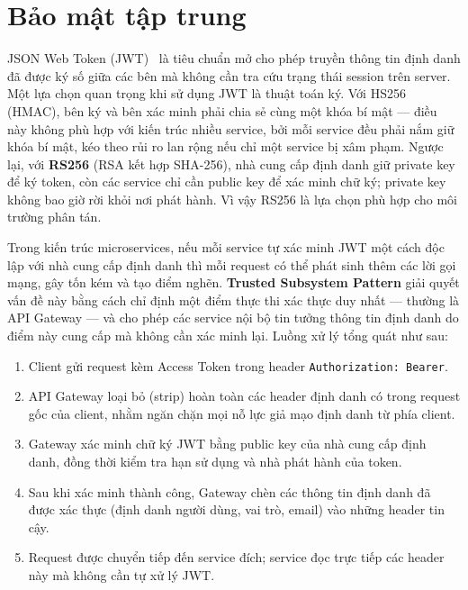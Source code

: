 \documentclass[../DoAn.tex]{subfiles}
\begin{document}

\section{Bảo mật tập trung}
\label{section:2.6}

JSON Web Token (JWT)~\cite{rfc7519} là tiêu chuẩn mở cho phép truyền thông tin định danh đã
được ký số giữa các bên mà không cần tra cứu trạng thái session trên server. Một lựa chọn
quan trọng khi sử dụng JWT là thuật toán ký. Với HS256 (HMAC), bên ký và bên xác minh phải
chia sẻ cùng một khóa bí mật --- điều này không phù hợp với kiến trúc nhiều service, bởi mỗi
service đều phải nắm giữ khóa bí mật, kéo theo rủi ro lan rộng nếu chỉ một service bị xâm
phạm. Ngược lại, với \textbf{RS256} (RSA kết hợp SHA-256), nhà cung cấp định danh giữ private
key để ký token, còn các service chỉ cần public key để xác minh chữ ký; private key không bao
giờ rời khỏi nơi phát hành. Vì vậy RS256 là lựa chọn phù hợp cho môi trường phân tán.

Trong kiến trúc microservices, nếu mỗi service tự xác minh JWT một cách độc lập với nhà cung
cấp định danh thì mỗi request có thể phát sinh thêm các lời gọi mạng, gây tốn kém và tạo điểm
nghẽn. \textbf{Trusted Subsystem Pattern} giải quyết vấn đề này bằng cách chỉ định một điểm
thực thi xác thực duy nhất --- thường là API Gateway --- và cho phép các service nội bộ tin
tưởng thông tin định danh do điểm này cung cấp mà không cần xác minh lại. Luồng xử lý tổng
quát như sau:

\begin{enumerate}[noitemsep]
    \item Client gửi request kèm Access Token trong header \texttt{Authorization: Bearer}.
    \item API Gateway loại bỏ (strip) hoàn toàn các header định danh có trong request gốc của
          client, nhằm ngăn chặn mọi nỗ lực giả mạo định danh từ phía client.
    \item Gateway xác minh chữ ký JWT bằng public key của nhà cung cấp định danh, đồng thời
          kiểm tra hạn sử dụng và nhà phát hành của token.
    \item Sau khi xác minh thành công, Gateway chèn các thông tin định danh đã được xác thực
          (định danh người dùng, vai trò, email) vào những header tin cậy.
    \item Request được chuyển tiếp đến service đích; service đọc trực tiếp các header này mà
          không cần tự xử lý JWT.
\end{enumerate}
\end{document}
